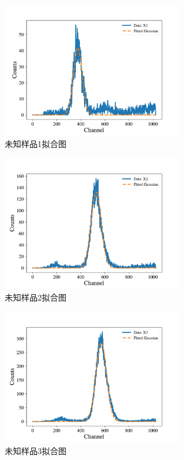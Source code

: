\documentclass{article}
\begin{document}
    \begin{figure}[htbp]
        \centering
        \includegraphics[width=0.7\textwidth]{../plot/Fitted_X1.pdf}
        \caption{未知样品1拟合图\label{fig:Fitted_X1}}
    \end{figure}
    \begin{figure}[htbp]
        \centering
        \includegraphics[width=0.7\textwidth]{../plot/Fitted_X2.pdf}
        \caption{未知样品2拟合图\label{fig:Fitted_X2}}
    \end{figure}
    \begin{figure}[htbp]
        \centering
        \includegraphics[width=0.7\textwidth]{../plot/Fitted_X3.pdf}
        \caption{未知样品3拟合图\label{fig:Fitted_X3}}
    \end{figure}
     
\end{document}
